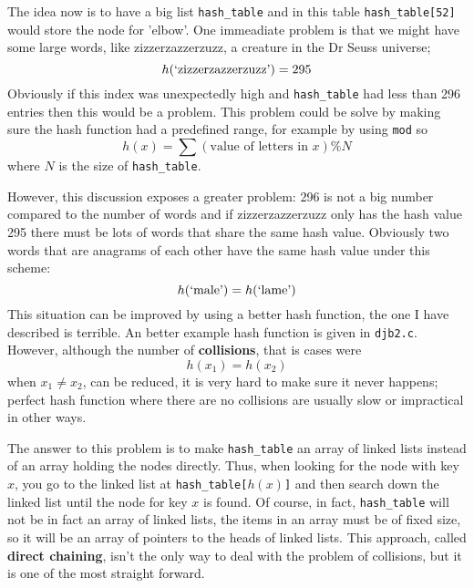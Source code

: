\documentclass[11pt,a4paper]{scrartcl}
\begin{document}
The idea now is to have a big list \texttt{hash\_table} and in this
table \texttt{hash\_table[52]} would store the node for 'elbow'. One
immeadiate problem is that we might have some large words, like
zizzerzazzerzuzz, a creature in the Dr Seuss universe;
\begin{equation}
h(\mbox{\lq{}zizzerzazzerzuzz\rq{}})=295
\end{equation}
Obviously if this index was unexpectedly high and \texttt{hash\_table}
had less than 296 entries then this would be a problem. This problem
could be solve by making sure the hash function had a predefined
range, for example by using \texttt{mod} so
\begin{equation}
h(x)=\sum{(\mbox{value of letters in }x)}\% N
\end{equation}
where $N$ is the size of \texttt{hash\_table}.

However, this discussion exposes a greater problem: 296 is not a big
number compared to the number of words and if zizzerzazzerzuzz only
has the hash value 295 there must be lots of words that share the same
hash value. Obviously two words that are anagrams of each other have
the same hash value under this scheme:
\begin{equation}
h(\mbox{\lq{}male\rq{}})=h(\mbox{\lq{}lame\rq{}})
\end{equation}
This situation can be improved by using a better hash function, the
one I have described is terrible. An better example hash function is
given in \texttt{djb2.c}. However, although the number of
\textbf{collisions}, that is cases were
\begin{equation}
h(x_1)=h(x_2)
\end{equation}
when $x_1\not=x_2$, can be reduced, it is very hard to make sure it
never happens; perfect hash function where there are no collisions
are usually slow or impractical in other ways.

The answer to this problem is to make \texttt{hash\_table} an array of
linked lists instead of an array holding the nodes directly. Thus,
when looking for the node with key $x$, you go to the linked list at
\texttt{hash\_table[$h(x)$]} and then search down the linked list
until the node for key $x$ is found. Of course, in fact,
\texttt{hash\_table} will not be in fact an array of linked lists, the
items in an array must be of fixed size, so it will be an array of
pointers to the heads of linked lists. This approach, called
\textbf{direct chaining}, isn't the only way to deal with the problem
of collisions, but it is one of the most straight forward.
\end{document}

